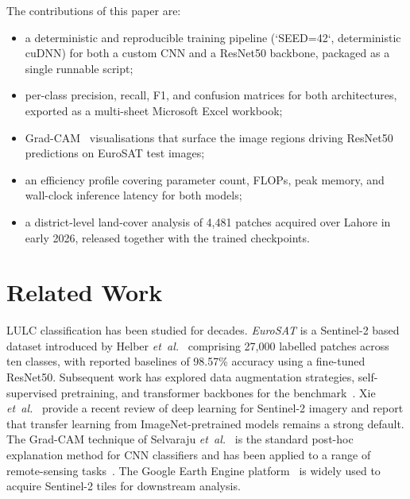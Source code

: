 \documentclass[conference]{IEEEtran}
\begin{document}
The contributions of this paper are:
\begin{itemize}
  \item a deterministic and reproducible training pipeline
        (`SEED=42`, deterministic cuDNN) for both a custom CNN and
        a ResNet50 backbone, packaged as a single runnable script;
  \item per-class precision, recall, F1, and confusion matrices
        for both architectures, exported as a multi-sheet
        Microsoft Excel workbook;
  \item Grad-CAM~\cite{selvaraju2017gradcam} visualisations that
        surface the image regions driving ResNet50 predictions on
        EuroSAT test images;
  \item an efficiency profile covering parameter count, FLOPs, peak
        memory, and wall-clock inference latency for both models;
  \item a district-level land-cover analysis of 4{,}481 patches
        acquired over Lahore in early 2026, released together with
        the trained checkpoints.
\end{itemize}

\section{Related Work}
\label{sec:related}

LULC classification has been studied for decades. \emph{EuroSAT} is
a Sentinel-2 based dataset introduced by Helber \emph{et~al.}~\cite{helber2017eurosat,helber2019eurosat} comprising 27{,}000
labelled patches across ten classes, with reported baselines of
98.57\% accuracy using a fine-tuned ResNet50.
Subsequent work has explored data augmentation strategies,
self-supervised pretraining, and transformer backbones for the
benchmark~\cite{rao2020eurosat,bao2022swin}.
Xie \emph{et~al.}~\cite{xie2020sentinel} provide a recent review
of deep learning for Sentinel-2 imagery and report that transfer
learning from ImageNet-pretrained models remains a strong default.
The Grad-CAM technique of Selvaraju \emph{et~al.}~\cite{selvaraju2017gradcam} is the standard
post-hoc explanation method for CNN classifiers and has been applied
to a range of remote-sensing tasks~\cite{lsg19}.
The Google Earth Engine platform~\cite{gorelick2017gee} is widely
used to acquire Sentinel-2 tiles for downstream analysis.

\end{document}
